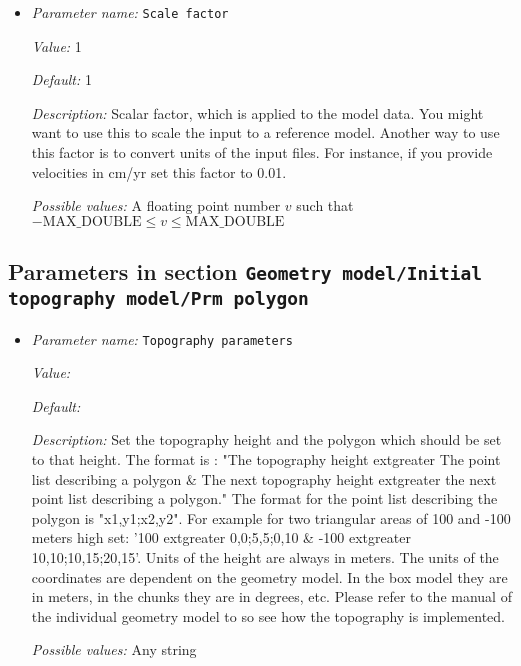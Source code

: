 \begin{itemize}
{\it Possible values:} Any string
\item {\it Parameter name:} {\tt Scale factor}
\label{parameters:Geometry model/Initial topography model/Ascii data model/Scale factor}
\label{parameters:Geometry_20model/Initial_20topography_20model/Ascii_20data_20model/Scale_20factor}


{\it Value:} 1


{\it Default:} 1


{\it Description:} Scalar factor, which is applied to the model data. You might want to use this to scale the input to a reference model. Another way to use this factor is to convert units of the input files. For instance, if you provide velocities in cm/yr set this factor to 0.01.


{\it Possible values:} A floating point number $v$ such that $-\text{MAX\_DOUBLE} \leq v \leq \text{MAX\_DOUBLE}$
\end{itemize}

\subsection{Parameters in section \tt Geometry model/Initial topography model/Prm polygon}
\label{parameters:Geometry_20model/Initial_20topography_20model/Prm_20polygon}

\begin{itemize}
\item {\it Parameter name:} {\tt Topography parameters}
\label{parameters:Geometry model/Initial topography model/Prm polygon/Topography parameters}
\label{parameters:Geometry_20model/Initial_20topography_20model/Prm_20polygon/Topography_20parameters}


{\it Value:} 


{\it Default:} 


{\it Description:} Set the topography height and the polygon which should be set to that height. The format is : "The topography height 	extgreater The point list describing a polygon \& The next topography height 	extgreater the next point list describing a polygon." The format for the point list describing the polygon is "x1,y1;x2,y2". For example for two triangular areas of 100 and -100 meters high set: '100 	extgreater 0,0;5,5;0,10 \& -100 	extgreater 10,10;10,15;20,15'. Units of the height are always in meters. The units of the coordinates are dependent on the geometry model. In the box model they are in meters, in the chunks they are in degrees, etc. Please refer to the manual of the individual geometry model to so see how the topography is implemented.


{\it Possible values:} Any string
\end{itemize}

